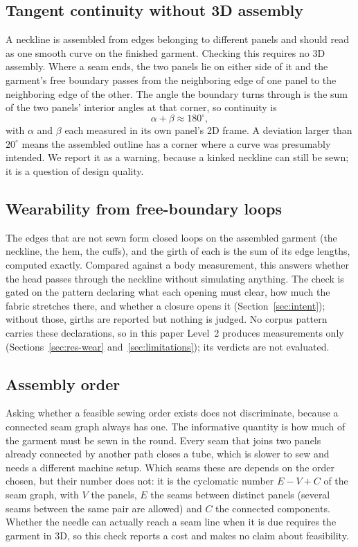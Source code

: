 \documentclass[10pt,twocolumn]{article}
\begin{document}
\subsection{Tangent continuity without 3D assembly}
\label{sec:continuity}

A neckline is assembled from edges belonging to different panels and should
read as one smooth curve on the finished garment. Checking this requires no 3D
assembly. Where a seam ends, the two panels lie on either side of it and the
garment's free boundary passes from the neighboring edge of one panel to the
neighboring edge of the other. The angle the boundary turns through is the sum
of the two panels' interior angles at that corner, so continuity is
\begin{equation}
  \alpha + \beta \approx 180^\circ,
  \label{eq:cont}
\end{equation}
with $\alpha$ and $\beta$ each measured in its own panel's 2D frame. A
deviation larger than $20^\circ$ means the assembled outline has a corner where a curve was presumably
intended. We report it as a warning, because a kinked neckline can still be
sewn; it is a question of design quality.

\subsection{Wearability from free-boundary loops}
\label{sec:wear}

The edges that are not sewn form closed loops on the assembled garment (the
neckline, the hem, the cuffs), and the girth of each is the sum of its edge
lengths, computed exactly. Compared against a body measurement, this answers
whether the head passes through the neckline without simulating anything. The
check is gated on the pattern declaring what each opening must clear, how much
the fabric stretches there, and whether a closure opens it
(Section~\ref{sec:intent}); without those, girths are reported but nothing is
judged. No corpus pattern carries these declarations, so in this paper Level~2
produces measurements only (Sections~\ref{sec:res-wear}
and~\ref{sec:limitations}); its verdicts are not evaluated.


\subsection{Assembly order}

Asking whether a feasible sewing order exists does not discriminate, because a
connected seam graph always has one. The informative quantity is how much of
the garment must be sewn in the round. Every seam that joins two panels already
connected by another path closes a tube, which is slower to sew and needs a
different machine setup. Which seams these are depends on the order chosen, but
their number does not: it is the cyclomatic number $E - V + C$ of the seam
graph, with $V$ the panels, $E$ the seams between distinct panels (several
seams between the same pair are allowed) and $C$ the connected components.
Whether the needle can actually reach a seam line when it is due requires the
garment in 3D, so this check reports a cost and makes no claim about
feasibility.
\end{document}
